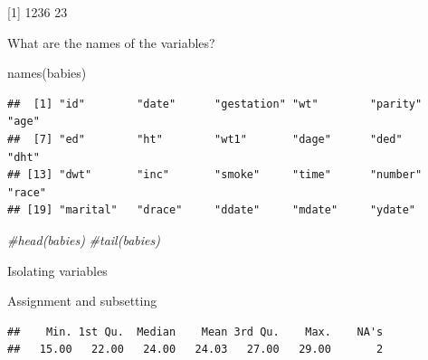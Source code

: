 \documentclass[
]{book}
\newenvironment{Shaded}{\begin{snugshade}}{\end{snugshade}}
\newcommand{\CommentTok}[1]{\textcolor[rgb]{0.56,0.35,0.01}{\textit{#1}}}
\newcommand{\DecValTok}[1]{\textcolor[rgb]{0.00,0.00,0.81}{#1}}
\newcommand{\FloatTok}[1]{\textcolor[rgb]{0.00,0.00,0.81}{#1}}
\newcommand{\FunctionTok}[1]{\textcolor[rgb]{0.00,0.00,0.00}{#1}}
\newcommand{\NormalTok}[1]{#1}
\newcommand{\OtherTok}[1]{\textcolor[rgb]{0.56,0.35,0.01}{#1}}
\newcommand{\SpecialCharTok}[1]{\textcolor[rgb]{0.00,0.00,0.00}{#1}}
\begin{document}
{[}1{]} 1236 23

What are the names of the variables?

\begin{Shaded}
\begin{Highlighting}[]
\FunctionTok{names}\NormalTok{(babies)}
\end{Highlighting}
\end{Shaded}

\begin{verbatim}
##  [1] "id"        "date"      "gestation" "wt"        "parity"    "age"      
##  [7] "ed"        "ht"        "wt1"       "dage"      "ded"       "dht"      
## [13] "dwt"       "inc"       "smoke"     "time"      "number"    "race"     
## [19] "marital"   "drace"     "ddate"     "mdate"     "ydate"
\end{verbatim}

\begin{Shaded}
\begin{Highlighting}[]
\CommentTok{\#head(babies)}
\CommentTok{\#tail(babies)}
\end{Highlighting}
\end{Shaded}

Isolating variables

\begin{Shaded}
\end{Shaded}

Assignment and subsetting

\begin{Shaded}
\end{Shaded}

\begin{verbatim}
##    Min. 1st Qu.  Median    Mean 3rd Qu.    Max.    NA's 
##   15.00   22.00   24.00   24.03   27.00   29.00       2
\end{verbatim}
\end{document}
